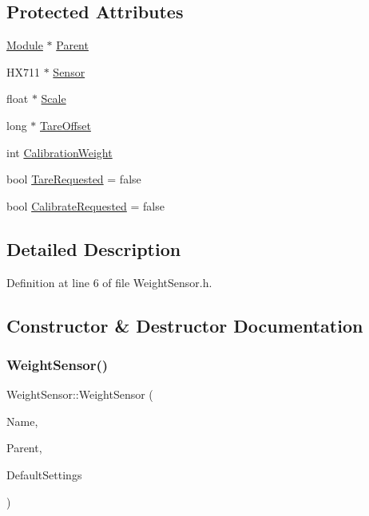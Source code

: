 \subsection*{Protected Attributes}
\begin{DoxyCompactItemize}
\item 
\hyperlink{class_module}{Module} $\ast$ \hyperlink{class_weight_sensor_abcba58bc00c355cc626499e019ac0d52}{Parent}
\item 
H\+X711 $\ast$ \hyperlink{class_weight_sensor_af93fa9745d30c03264f2ca8d5f652974}{Sensor}
\item 
float $\ast$ \hyperlink{class_weight_sensor_aa009a11ad14eb1d7b9e181e213e737eb}{Scale}
\item 
long $\ast$ \hyperlink{class_weight_sensor_a5b73b99f35b487b9c8d0c29d1f88a8a3}{Tare\+Offset}
\item 
int \hyperlink{class_weight_sensor_aed701fda701e06caf8ffdbbe6be8ad10}{Calibration\+Weight}
\item 
bool \hyperlink{class_weight_sensor_a49737914329de6cc5cb56f4089513d23}{Tare\+Requested} = false
\item 
bool \hyperlink{class_weight_sensor_a986fa9909ed3aa3aed2d54c2df768dbb}{Calibrate\+Requested} = false
\end{DoxyCompactItemize}


\subsection{Detailed Description}


Definition at line 6 of file Weight\+Sensor.\+h.



\subsection{Constructor \& Destructor Documentation}
\mbox{\label{class_weight_sensor_a7ea36c43abb037e5d88f6d181bd07b0d}} 
\subsubsection{\texorpdfstring{Weight\+Sensor()}{WeightSensor()}\hspace{0.1cm}{\footnotesize\ttfamily [1/2]}}
{\footnotesize\ttfamily Weight\+Sensor\+::\+Weight\+Sensor (\begin{DoxyParamCaption}\item[{const \+\_\+\+\_\+\+Flash\+String\+Helper $\ast$}]{Name,  }\item[{\hyperlink{class_module}{Module} $\ast$}]{Parent,  }\item[{\hyperlink{struct_settings_1_1_weight_sensor_settings}{Settings\+::\+Weight\+Sensor\+Settings} $\ast$}]{Default\+Settings }\end{DoxyParamCaption})}



